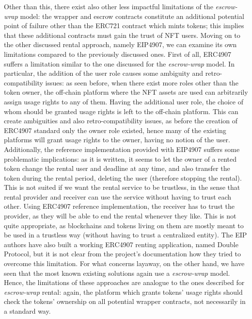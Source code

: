 \documentclass[english, LaM, oneside]{sapthesis}%
\begin{document}
Other than this, there exist also other less impactful limitations of the \textit{escrow-wrap} model: the wrapper and escrow contracts constitute an additional potential point of failure other than the ERC721 contract which mints tokens; this implies that these additional contracts must gain the trust of NFT users.\newline
Moving on to the other discussed rental approach, namely EIP4907, we can examine its own limitations compared to the previously discussed ones. First of all, ERC4907 suffers a limitation similar to the one discussed for the \textit{escrow-wrap} model. In particular, the addition of the user role causes some ambiguity and retro-compatibility issues: as seen before, when there exist more roles other than the token owner, the off-chain platform where the NFT assets are used can arbitrarily assign usage rights to any of them. Having the additional user role, the choice of whom should be granted usage rights is left to the off-chain platform. This can create ambiguities and also retro-compatibility issues, as before the creation of ERC4907 standard only the owner role existed, hence many of the existing platforms will grant usage rights to the owner, having no notion of the user.\newline
Additionally, the reference implementation provided with EIP4907 suffers some problematic implications: as it is written, it seems to let the owner of a rented token change the rental user and deadline at any time, and also transfer the token during the rental period, deleting the user (therefore stopping the rental). This is not suited if we want the rental service to be trustless, in the sense that rental provider and receiver can use the service without having to trust each other. Using ERC4907 reference implementation, the receiver has to trust the provider, as they will be able to end the rental whenever they like. This is not quite appropriate, as blockchains and tokens living on them are mostly meant to be used in a trustless way (without having to trust a centralized entity).
The EIP authors have also built a working ERC4907 renting application, named Double Protocol\cite{ref:double}, but it is not clear from the project's documentation how they tried to overcome this limitation. \newline
For what concerns layaway, on the other hand, we have seen that the most known existing solutions again use a \textit{escrow-wrap} model. Hence, the limitations of these approaches are analogue to the ones described for \textit{escrow-wrap} rental: again, the platform which grants tokens' usage rights should check the tokens' ownership on all potential wrapper contracts, not necessarily in a standard way.
\end{document}
